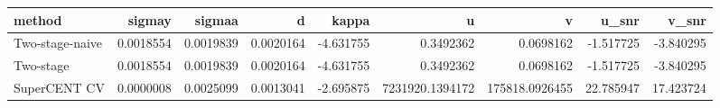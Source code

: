 
\begin{tabular}[t]{lrrrrrrrr}
\toprule
method & sigmay & sigmaa & d & kappa & u & v & u\_snr & v\_snr\\
\midrule
Two-stage-naive & 0.0018554 & 0.0019839 & 0.0020164 & -4.631755 & 0.3492362 & 0.0698162 & -1.517725 & -3.840295\\
Two-stage & 0.0018554 & 0.0019839 & 0.0020164 & -4.631755 & 0.3492362 & 0.0698162 & -1.517725 & -3.840295\\
SuperCENT CV & 0.0000008 & 0.0025099 & 0.0013041 & -2.695875 & 7231920.1394172 & 175818.0926455 & 22.785947 & 17.423724\\
\bottomrule
\end{tabular}
